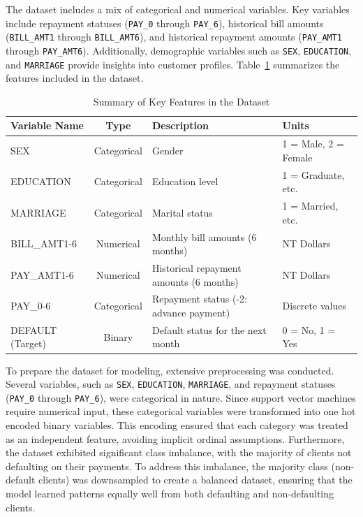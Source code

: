 \documentclass{article}
\begin{document}
The dataset includes a mix of categorical and numerical variables. Key variables include repayment statuses (\texttt{PAY\_0} through \texttt{PAY\_6}), 
historical bill amounts (\texttt{BILL\_AMT1} through \texttt{BILL\_AMT6}), and historical repayment amounts (\texttt{PAY\_AMT1} through \texttt{PAY\_AMT6}). 
Additionally, demographic variables such as \texttt{SEX}, \texttt{EDUCATION}, and \texttt{MARRIAGE} provide insights into customer profiles. Table~\ref{variables_table} 
summarizes the features included in the dataset.

\begin{table}[H]
\centering
\caption{Summary of Key Features in the Dataset}
\label{variables_table}
\begin{tabular}{@{}lcll@{}}
\toprule
\textbf{Variable Name} & \textbf{Type} & \textbf{Description}                  & \textbf{Units}       \\ \midrule
SEX                    & Categorical   & Gender                                & 1 = Male, 2 = Female \\
EDUCATION              & Categorical   & Education level                       & 1 = Graduate, etc.   \\
MARRIAGE               & Categorical   & Marital status                        & 1 = Married, etc.    \\
BILL\_AMT1-6           & Numerical     & Monthly bill amounts (6 months)       & NT Dollars           \\
PAY\_AMT1-6            & Numerical     & Historical repayment amounts (6 months) & NT Dollars         \\
PAY\_0-6               & Categorical   & Repayment status (-2: advance payment) & Discrete values      \\
DEFAULT (Target)       & Binary        & Default status for the next month     & 0 = No, 1 = Yes      \\ \bottomrule
\end{tabular}
\end{table}

To prepare the dataset for modeling, extensive preprocessing was conducted. Several variables, such as \texttt{SEX}, \texttt{EDUCATION}, \texttt{MARRIAGE}, 
and repayment statuses (\texttt{PAY\_0} through \texttt{PAY\_6}), were categorical in nature. Since support vector machines require numerical input, 
these categorical variables were transformed into one hot encoded binary variables. This encoding ensured that each category was treated as an independent feature, avoiding implicit ordinal assumptions. 
Furthermore, the dataset exhibited significant class imbalance, with the majority of clients not defaulting on their payments. To address this imbalance, the majority class (non-default clients) 
was downsampled to create a balanced dataset, ensuring that the model learned patterns equally well from both defaulting and non-defaulting clients.
\end{document}
